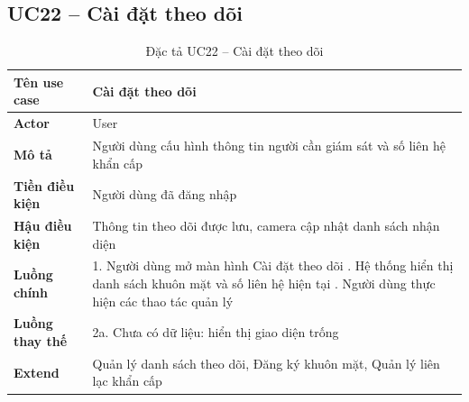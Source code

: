 \subsection*{UC22 -- Cài đặt theo dõi}
\begin{table}[H]
    \captionsetup{justification=raggedright, singlelinecheck=false}
    \caption{Đặc tả UC22 -- Cài đặt theo dõi}
\centering
\begin{tabular}{|p{3.5cm}|p{10cm}|}
\hline
\textbf{Tên use case} & Cài đặt theo dõi \\
\hline
\textbf{Actor} & User \\
\hline
\textbf{Mô tả} & Người dùng cấu hình thông tin người cần
  giám sát và số liên hệ khẩn cấp \\
\hline
\textbf{Tiền điều kiện} & Người dùng đã đăng nhập \\
\hline
\textbf{Hậu điều kiện} & Thông tin theo dõi được lưu,
  camera cập nhật danh sách nhận diện \\
\hline
\textbf{Luồng chính} &
  1. Người dùng mở màn hình Cài đặt theo dõi \newline
  2. Hệ thống hiển thị danh sách khuôn mặt và
     số liên hệ hiện tại \newline
  3. Người dùng thực hiện các thao tác quản lý \\
\hline
\textbf{Luồng thay thế} &
  2a. Chưa có dữ liệu: hiển thị giao diện trống \\
\hline
\textbf{Extend} & Quản lý danh sách theo dõi,
  Đăng ký khuôn mặt, Quản lý liên lạc khẩn cấp \\
\hline
\end{tabular}

\end{table}

